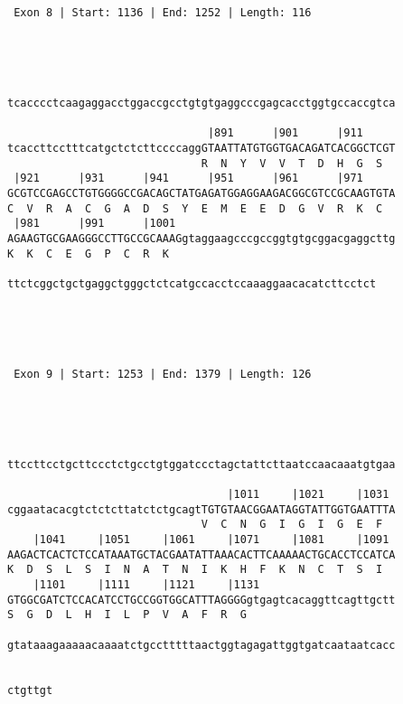 \documentclass{article}
\begin{document}
\begin{Verbatim}
 Exon 8 | Start: 1136 | End: 1252 | Length: 116 




                                                            
tcacccctcaagaggacctggaccgcctgtgtgaggcccgagcacctggtgccaccgtca
                                                            
                               |891      |901      |911     
tcaccttcctttcatgctctcttccccaggGTAATTATGTGGTGACAGATCACGGCTCGT
                              R  N  Y  V  V  T  D  H  G  S  
 |921      |931      |941      |951      |961      |971     
GCGTCCGAGCCTGTGGGGCCGACAGCTATGAGATGGAGGAAGACGGCGTCCGCAAGTGTA
C  V  R  A  C  G  A  D  S  Y  E  M  E  E  D  G  V  R  K  C  
 |981      |991      |1001                                  
AGAAGTGCGAAGGGCCTTGCCGCAAAGgtaggaagcccgccggtgtgcggacgaggcttg
K  K  C  E  G  P  C  R  K                                   
                                                         
ttctcggctgctgaggctgggctctcatgccacctccaaaggaacacatcttcctct
                                                         




 Exon 9 | Start: 1253 | End: 1379 | Length: 126 




                                                            
ttccttcctgcttccctctgcctgtggatccctagctattcttaatccaacaaatgtgaa
                                                            
                                  |1011     |1021     |1031 
cggaatacacgtctctcttatctctgcagtTGTGTAACGGAATAGGTATTGGTGAATTTA
                              V  C  N  G  I  G  I  G  E  F  
    |1041     |1051     |1061     |1071     |1081     |1091 
AAGACTCACTCTCCATAAATGCTACGAATATTAAACACTTCAAAAACTGCACCTCCATCA
K  D  S  L  S  I  N  A  T  N  I  K  H  F  K  N  C  T  S  I  
    |1101     |1111     |1121     |1131                     
GTGGCGATCTCCACATCCTGCCGGTGGCATTTAGGGGgtgagtcacaggttcagttgctt
S  G  D  L  H  I  L  P  V  A  F  R  G                       
                                                            
gtataaagaaaaacaaaatctgcctttttaactggtagagattggtgatcaataatcacc
                                                            
       
ctgttgt
       





\end{Verbatim}
\end{document}
